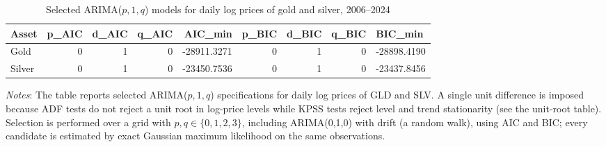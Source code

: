 \begin{table}[H]
\centering
\caption{Selected ARIMA($p,1,q$) models for daily log prices of gold and silver, 2006--2024}
\label{tab:arima-selection}
\begin{tabular}{lrrrrrrr}
\toprule
Asset & p_AIC & d_AIC & q_AIC & AIC_min & p_BIC & d_BIC & q_BIC & BIC_min \\
\midrule
Gold & 0 & 1 & 0 & -28911.3271 & 0 & 1 & 0 & -28898.4190 \\
Silver & 0 & 1 & 0 & -23450.7536 & 0 & 1 & 0 & -23437.8456 \\
\bottomrule
\end{tabular}

\vspace{0.2cm}
\begin{minipage}{0.9\textwidth}
\footnotesize
\textit{Notes}: The table reports selected ARIMA($p,1,q$) specifications for daily log prices of GLD and SLV. A single unit difference is imposed because ADF tests do not reject a unit root in log-price levels while KPSS tests reject level and trend stationarity (see the unit-root table). Selection is performed over a grid with $p,q \in \{0,1,2,3\}$, including ARIMA(0,1,0) with drift (a random walk), using AIC and BIC; every candidate is estimated by exact Gaussian maximum likelihood on the same observations.
\end{minipage}
\end{table}
